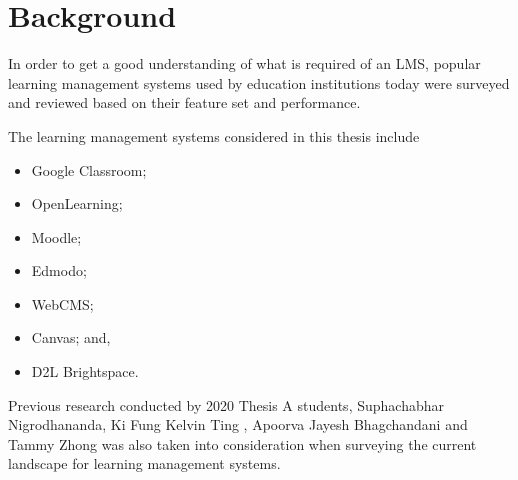 \chapter{Background}\label{ch:background}
In order to get a good understanding of what is required of an LMS, popular learning management systems used by education institutions today were surveyed and reviewed based on their feature set and performance.

The learning management systems considered in this thesis include

\begin{itemize}
    \item Google Classroom;
    \item OpenLearning;
    \item Moodle;
    \item Edmodo;
    \item WebCMS;
    \item Canvas; and,
    \item D2L Brightspace.
\end{itemize}

Previous research conducted by 2020 Thesis A students, Suphachabhar Nigrodhananda, Ki Fung Kelvin Ting \cite{prevThesisA1}, Apoorva Jayesh Bhagchandani \cite{prevThesisA2} and Tammy Zhong \cite{prevThesisA3} was also taken into consideration when surveying the current landscape for learning management systems.

\newpage

